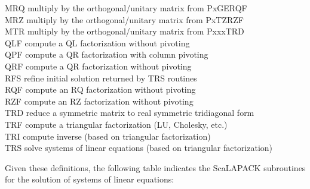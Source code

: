 \documentclass[11pt]{report}
\begin{document}
\begin{tabbing}
MRQ \>  multiply by the orthogonal/unitary matrix from PxGERQF \\
MRZ \>  multiply by the orthogonal/unitary matrix from PxTZRZF \\
MTR \>  multiply by the orthogonal/unitary matrix from PxxxTRD \\
QLF \>  compute a QL factorization without pivoting \\
QPF \>  compute a QR factorization with column pivoting\\
QRF \>  compute a QR factorization without pivoting \\
RFS \>  refine initial solution returned by TRS routines \\
RQF \>  compute an RQ factorization without pivoting \\
RZF \>  compute an RZ factorization without pivoting \\
TRD \>  reduce a symmetric matrix to real symmetric tridiagonal form \\
TRF \>  compute a triangular factorization (LU, Cholesky, etc.) \\
TRI \>  compute inverse (based on triangular factorization)\\
TRS \>  solve systems of linear equations (based on triangular factorization)
\end{tabbing}

\vspace{5pt}
Given these definitions, the following table indicates the ScaLAPACK
subroutines for the solution of systems of linear equations:
\end{document}
